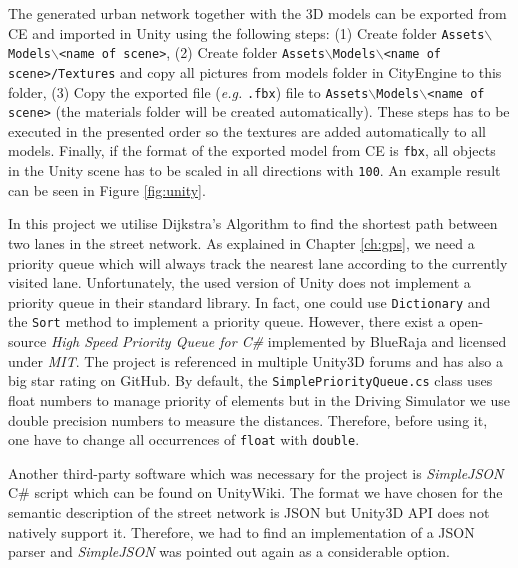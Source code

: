 The generated urban network together with the 3D models can be exported from CE and imported in Unity using the following steps: (1) Create folder \texttt{Assets$\backslash$Models$\backslash$<name of scene>}, (2) Create folder \texttt{Assets$\backslash$Models$\backslash$<name of scene>/Textures} and copy all pictures from models folder in CityEngine to this folder, (3) Copy the exported file (\emph{e.g.} \texttt{.fbx}) file to \texttt{Assets$\backslash$Models$\backslash$<name of scene>} (the materials folder will be created automatically). These steps has to be executed in the presented order so the textures are added automatically to all models. Finally, if the format of the exported model from CE is \texttt{fbx}, all objects in the Unity scene has to be scaled in all directions with \texttt{100}. An example result can be seen in Figure \ref{fig:unity}.

In this project we utilise Dijkstra's Algorithm to find the shortest path between two lanes in the street network. As explained in Chapter \ref{ch:gps}, we need a priority queue which will always track the nearest lane according to the currently visited lane. Unfortunately, the used version of Unity does not implement a priority queue in their standard library. In fact, one could use \texttt{Dictionary} and the \texttt{Sort} method to implement a priority queue. However, there exist a open-source \emph{High Speed Priority Queue for C\#}\cite{pq} implemented by BlueRaja and licensed under \emph{MIT}. The project is referenced in multiple Unity3D forums and has also a big star rating on GitHub. By default, the \texttt{SimplePriorityQueue.cs} class uses float numbers to manage priority of elements but in the Driving Simulator we use double precision numbers to measure the distances. Therefore, before using it, one have to change all occurrences of \texttt{float} with \texttt{double}.

Another third-party software which was necessary for the project is \emph{SimpleJSON} C\# script which can be found on UnityWiki. The format we have chosen for the semantic description of the street network is JSON but Unity3D API does not natively support it. Therefore, we had to find an implementation of a JSON parser and \emph{SimpleJSON} was pointed out again as a considerable option.
